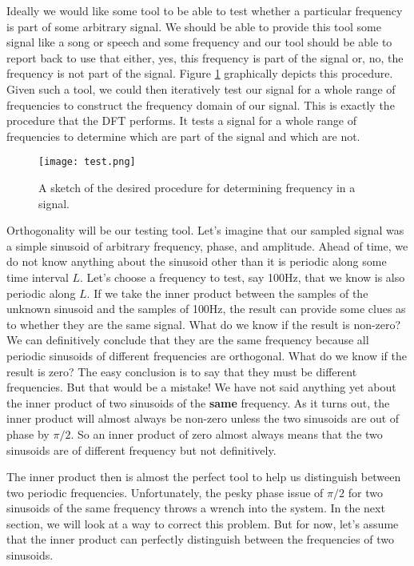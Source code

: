 Ideally we would like some tool to be able to test whether a particular frequency is part
of some arbitrary signal.  We should be able to provide this tool some signal like a song
or speech and some frequency and our tool should be able to report back to use that either,
yes, this frequency is part of the signal or, no, the frequency is not part of the signal.
Figure \ref{fig:test} graphically depicts this procedure.  	Given such a tool, we could then 
iteratively test our signal for a whole range of frequencies
to construct the frequency domain of our signal.  This is exactly the procedure that the 
DFT performs.  It tests a signal for a whole range of frequencies to determine which are 
part of the signal and which are not.

\begin{figure}[h]
\caption{A sketch of the desired procedure for determining frequency in a signal.}
\centering
\texttt{[image: test.png]}
\label{fig:test}
\end{figure}

Orthogonality will be our testing tool.  Let's imagine that our sampled signal was a simple
sinusoid of arbitrary frequency, phase, and amplitude.  Ahead of time, we do not know
anything about the sinusoid other than it is periodic along some time interval $L$.  Let's 
choose a frequency to test, say 100Hz, that we know is also periodic along $L$.  If we take
the inner product between the samples of the unknown sinusoid and the samples of 100Hz,
the result can provide some clues as to whether they are the same signal.  What do we know 
if the result is non-zero?  We can definitively conclude that they are the same frequency because
all periodic sinusoids of different frequencies are orthogonal.  What do we know if the result is 
zero?  The easy conclusion is to say that they must be different frequencies.  But that would
be a mistake!  We have not said anything yet about the inner product of two sinusoids of the
\textbf{same} frequency.  As it turns out, the inner product will almost always be non-zero 
unless the two sinusoids are out of phase by $\pi/2$.  So an inner product of zero almost
always means that the two sinusoids are of different frequency but not definitively.

	The inner product then is almost the perfect tool to help us distinguish between two
periodic frequencies.  Unfortunately, the pesky phase issue of $\pi/2$ for two sinusoids of 
the same frequency throws a wrench into the system.  In the next section, we will look at a way
to correct this problem.  But for now, let's assume that the inner product can perfectly distinguish
between the frequencies of two sinusoids.  

